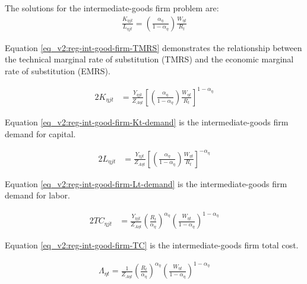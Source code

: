 \documentclass[../thesis.tex]{subfiles}
\begin{document}

The solutions for the intermediate-goods firm problem are:
\begin{align}
\frac{K_{\eta jt}}{L_{\eta jt}} = \left( \frac{{\alpha_{\eta}}}{1-\alpha_{\eta}} \right) \frac{W_{\eta t}}{R_{t}} \label{eq_v2:reg-int-good-firm-TMRS}
\end{align}

Equation \ref{eq_v2:reg-int-good-firm-TMRS} demonstrates the relationship between the technical marginal rate of substitution (TMRS) and the economic marginal rate of substitution (EMRS). 

\begin{alignat}{2}
	K_{\eta jt} & = \frac{Y_{\eta jt}}{Z_{A\eta t}} \left[ \left( \frac{{\alpha_{\eta}}}{1-\alpha_{\eta}} \right) \frac{W_{\eta t}}{R_{t}}\right]^{1-\alpha_{\eta}} \label{eq_v2:reg-int-good-firm-Kt-demand}
\end{alignat}

Equation \ref{eq_v2:reg-int-good-firm-Kt-demand} is the intermediate-goods firm demand for capital. 

\begin{alignat}{2}
	L_{\eta jt} & = \frac{Y_{\eta jt}}{Z_{A\eta t}} \left[ \left( \frac{{\alpha_{\eta}}}{1-\alpha_{\eta}} \right) \frac{W_{\eta t}}{R_{t}}\right]^{-{\alpha_{\eta}}} \label{eq_v2:reg-int-good-firm-Lt-demand}
\end{alignat}

Equation \ref{eq_v2:reg-int-good-firm-Lt-demand} is the intermediate-goods firm demand for labor.

\begin{alignat}{2}
	TC_{\eta jt} & = \frac{Y_{\eta jt}}{Z_{A\eta t}} \left( \frac{R_{t}}{{\alpha_{\eta}}} \right)^{{\alpha_{\eta}}} \left( \frac{W_{\eta t}}{1-\alpha_{\eta}} \right)^{1-\alpha_{\eta}} \label{eq_v2:reg-int-good-firm-TC}
\end{alignat}

Equation \ref{eq_v2:reg-int-good-firm-TC} is the intermediate-goods firm total cost.

\begin{align}
	\Lambda_{\eta t} = \frac{1}{Z_{A\eta t}} \left( \frac{R_{t}}{{\alpha_{\eta}}} \right)^{{\alpha_{\eta}}} \left( \frac{W_{\eta t}}{1-\alpha_{\eta}} \right)^{1-\alpha_{\eta}} \label{eq_v2:reg-int-good-firm-MC-2}
\end{align}
\end{document}
